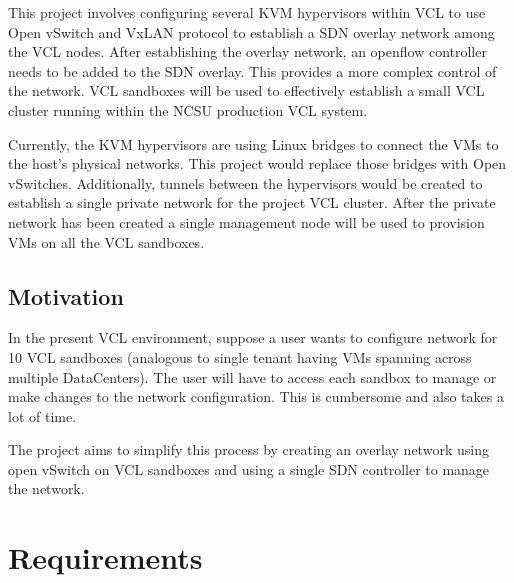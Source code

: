 \documentclass{article}
\begin{document}
This project involves configuring several KVM hypervisors within VCL to use Open vSwitch and VxLAN protocol to establish a SDN overlay network among the VCL nodes. After establishing the overlay network, an openflow controller needs to be added to the SDN overlay. This provides a more complex control of the network. VCL sandboxes will be used to effectively establish a small VCL cluster running within the NCSU production VCL system.

Currently, the KVM hypervisors are using Linux bridges to connect the VMs to the host’s physical networks. This project would replace those bridges with Open vSwitches.  Additionally, tunnels between the hypervisors would be created to establish a single private network for the project VCL cluster. After the private network has been created a single management node will be used to provision VMs on all the VCL sandboxes.

\subsection{Motivation}
In the present VCL environment, suppose a user wants to configure network for 10 VCL sandboxes (analogous to single tenant having VMs spanning across multiple DataCenters). The user will have to access each sandbox to manage or make changes to the network configuration. This is cumbersome and also takes a lot of time.

The project aims to simplify this process by creating an overlay network using open vSwitch on VCL sandboxes and using a single SDN controller to manage the network. 



\section{Requirements}
\end{document}
